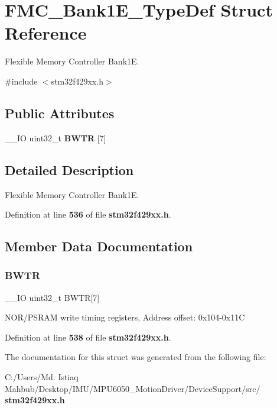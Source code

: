 \section{F\+M\+C\+\_\+\+Bank1\+E\+\_\+\+Type\+Def Struct Reference}
\label{structFMC__Bank1E__TypeDef}


Flexible Memory Controller Bank1E.  




{\ttfamily \#include $<$stm32f429xx.\+h$>$}

\subsection*{Public Attributes}
\begin{DoxyCompactItemize}
\item 
\+\_\+\+\_\+\+IO uint32\+\_\+t \textbf{ B\+W\+TR} [7]
\end{DoxyCompactItemize}


\subsection{Detailed Description}
Flexible Memory Controller Bank1E. 

Definition at line \textbf{ 536} of file \textbf{ stm32f429xx.\+h}.



\subsection{Member Data Documentation}
\mbox{\label{structFMC__Bank1E__TypeDef_a20f13b79c0f8670af319af0c5ebd5c91}} 
\subsubsection{B\+W\+TR}
{\footnotesize\ttfamily \+\_\+\+\_\+\+IO uint32\+\_\+t B\+W\+TR[7]}

N\+O\+R/\+P\+S\+R\+AM write timing registers, Address offset\+: 0x104-\/0x11C 

Definition at line \textbf{ 538} of file \textbf{ stm32f429xx.\+h}.



The documentation for this struct was generated from the following file\+:\begin{DoxyCompactItemize}
\item 
C\+:/\+Users/\+Md. Istiaq Mahbub/\+Desktop/\+I\+M\+U/\+M\+P\+U6050\+\_\+\+Motion\+Driver/\+Device\+Support/src/\textbf{ stm32f429xx.\+h}\end{DoxyCompactItemize}
